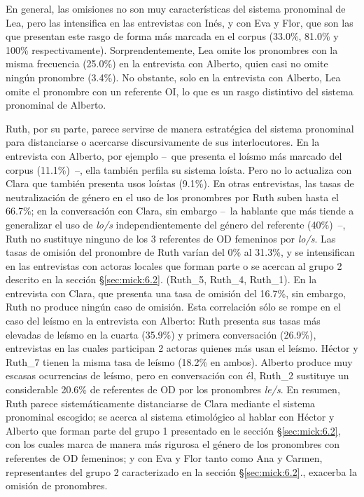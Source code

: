 \documentclass[output=paper]{../langscibook}
\begin{document}
En general, las omisiones no son muy características del sistema pronominal de Lea, pero las intensifica en las entrevistas con Inés, y con Eva y Flor, que son las que presentan este rasgo de forma más marcada en el corpus (33.0\%, 81.0\% y 100\% respectivamente). Sorprendentemente, Lea omite los pronombres con la misma frecuencia (25.0\%) en la entrevista con Alberto, quien casi no omite ningún pronombre (3.4\%). No obstante, solo en la entrevista con Alberto, Lea omite el pronombre con un referente OI, lo que es un rasgo distintivo del sistema pronominal de Alberto. 

Ruth, por su parte, parece servirse de manera estratégica del sistema pronominal para distanciarse o acercarse discursivamente de sus interlocutores. En la entrevista con Alberto, por ejemplo – que presenta el loísmo más marcado del corpus (11.1\%) –, ella también perfila su sistema loísta. Pero no lo actualiza con Clara que también presenta usos loístas (9.1\%). En otras entrevistas, las tasas de neutralización de género en el uso de los pronombres por Ruth suben hasta el 66.7\%; en la conversación con Clara, sin embargo – la hablante que más tiende a generalizar el uso de \textit{lo/s} independientemente del género del referente (40\%) –, Ruth no sustituye ninguno de los 3 referentes de OD femeninos por \textit{lo/s}. Las tasas de omisión del pronombre de Ruth varían del 0\% al 31.3\%, y se intensifican en las entrevistas con actoras locales que forman parte o se acercan al grupo 2 descrito en la sección §\ref{sec:mick:6.2}. (Ruth\_5, Ruth\_4, Ruth\_1). En la entrevista con Clara, que presenta una tasa de omisión del 16.7\%, sin embargo, Ruth no produce ningún caso de omisión.
Esta correlación sólo se rompe en el caso del leísmo en la entrevista con Alberto: Ruth presenta sus tasas más elevadas de leísmo en la cuarta (35.9\%) y primera conversación (26.9\%), entrevistas en las cuales participan 2 actoras  quienes más usan el leísmo. Héctor y Ruth\_7 tienen la misma tasa de leísmo (18.2\% en ambos). Alberto produce muy escasas ocurrencias de leísmo, pero en conversación con él, Ruth\_2 sustituye un considerable 20.6\% de referentes de OD por los pronombres \textit{le/s}. En resumen, Ruth parece sistemáticamente distanciarse de Clara mediante el sistema pronominal escogido; se acerca al sistema etimológico al hablar con Héctor y Alberto que forman parte del grupo 1 presentado en le sección §\ref{sec:mick:6.2}, con los cuales marca de manera más rigurosa el género de los pronombres con referentes de OD femeninos; y con Eva y Flor tanto como Ana y Carmen, representantes del grupo 2 caracterizado en la sección §\ref{sec:mick:6.2}., exacerba la omisión de pronombres.
\end{document}
